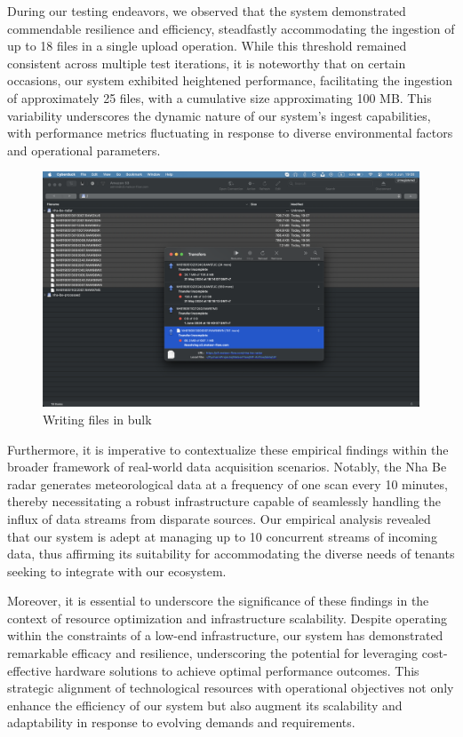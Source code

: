 During our testing endeavors, we observed that the system demonstrated
commendable resilience and efficiency, steadfastly accommodating the ingestion
of up to 18 files in a single upload operation. While this threshold remained
consistent across multiple test iterations, it is noteworthy that on certain
occasions, our system exhibited heightened performance, facilitating the
ingestion of approximately 25 files, with a cumulative size approximating 100
MB. This variability underscores the dynamic nature of our system's ingest
capabilities, with performance metrics fluctuating in response to diverse
environmental factors and operational parameters.

\begin{figure}[H]
    \centering
    \includegraphics[width=0.8\linewidth]{Images/5-upload-18-files.png}
    \vspace{1cm}
    \caption{Writing files in bulk}
    \label{fig:bulk-write}
\end{figure}

Furthermore, it is imperative to contextualize these empirical findings within
the broader framework of real-world data acquisition scenarios. Notably, the Nha
Be radar generates meteorological data at a frequency of one scan every 10
minutes, thereby necessitating a robust infrastructure capable of seamlessly
handling the influx of data streams from disparate sources. Our empirical
analysis revealed that our system is adept at managing up to 10 concurrent
streams of incoming data, thus affirming its suitability for accommodating the
diverse needs of tenants seeking to integrate with our ecosystem.

Moreover, it is essential to underscore the significance of these findings in
the context of resource optimization and infrastructure scalability. Despite
operating within the constraints of a low-end infrastructure, our system has
demonstrated remarkable efficacy and resilience, underscoring the potential for
leveraging cost-effective hardware solutions to achieve optimal performance
outcomes. This strategic alignment of technological resources with operational
objectives not only enhance the efficiency of our system but also augment its
scalability and adaptability in response to evolving demands and requirements.

